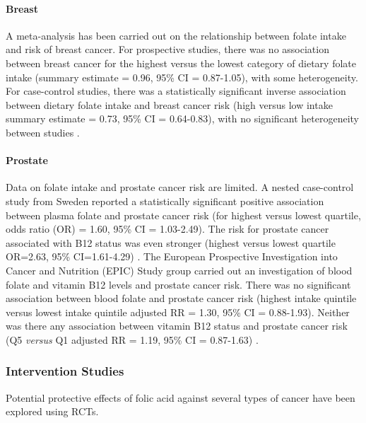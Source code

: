 \paragraph{Breast} %
A meta-analysis has been carried out on the relationship between folate intake and risk of breast cancer. For prospective studies, there was no association between breast cancer for the highest versus the lowest category of dietary folate intake (summary estimate = 0.96, 95\% CI = 0.87-1.05), with some heterogeneity. For case-control studies, there was a statistically significant inverse association between dietary folate intake and breast cancer risk (high versus low intake summary estimate = 0.73, 95\% CI = 0.64-0.83), with no significant heterogeneity between studies \cite{c235}. 
 
\paragraph{Prostate} %
Data on folate intake and prostate cancer risk are limited. A nested case-control study from Sweden reported a statistically significant positive association between plasma folate and prostate cancer risk (for highest versus lowest quartile, odds ratio (OR) = 1.60, 95\% CI = 1.03-2.49). The risk for prostate cancer associated with B12 status was even stronger (highest versus lowest quartile OR=2.63, 95\% CI=1.61-4.29) \cite{c236}. The European Prospective Investigation into Cancer and Nutrition (EPIC) Study group carried out an investigation of blood folate and vitamin B12 levels and prostate cancer risk. There was no significant association between blood folate and prostate cancer risk (highest intake quintile versus lowest intake quintile adjusted RR = 1.30, 95\% CI = 0.88-1.93). Neither was there any association between vitamin B12 status and prostate cancer risk (Q5 \emph{versus} Q1 adjusted RR = 1.19, 95\% CI = 0.87-1.63) \cite{c237}. 
 
\subsubsection{Intervention Studies} %
\noindent Potential protective effects of folic acid against several types of cancer have been explored using RCTs. 
 
